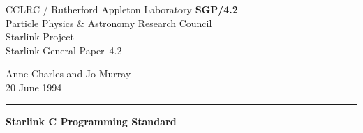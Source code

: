 \documentclass[twoside,11pt]{article}
\newcommand{\stardoccategory}  {Starlink General Paper}
\newcommand{\stardocinitials}  {SGP}
\newcommand{\stardocnumber}    {4.2}
\newcommand{\stardocauthors}   {Anne Charles and Jo Murray}
\newcommand{\stardocdate}      {20 June 1994}
\newcommand{\stardoctitle}     {Starlink C Programming Standard}
\newcommand{\stardocname}{\stardocinitials /\stardocnumber}
\newenvironment{latexonly}{}{}
\begin{document}
\thispagestyle{empty}

\begin{latexonly}
   CCLRC / {\sc Rutherford Appleton Laboratory} \hfill {\bf \stardocname}\\
   {\large Particle Physics \& Astronomy Research Council}\\
   {\large Starlink Project\\}
   {\large \stardoccategory\ \stardocnumber}
   \begin{flushright}
   \stardocauthors\\
   \stardocdate
   \end{flushright}
   \vspace{-4mm}
   \rule{\textwidth}{0.5mm}
   \vspace{5mm}
   \begin{center}
   {\Large\bf \stardoctitle}
   \end{center}
   \vspace{5mm}

\end{latexonly}
\end{document}
